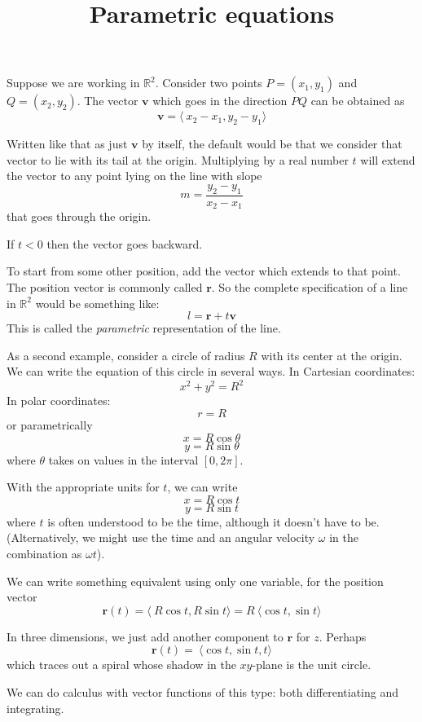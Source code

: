 \documentclass[11pt, oneside]{article}
\title{Parametric equations}
\date{}
\begin{document}
\maketitle
\Large

\label{sec:Parametric_equations}

Suppose we are working in $\mathbb{R}^2$.  Consider two points $P = (x_1,y_1)$ and $Q = (x_2, y_2)$.  The vector $\mathbf{v}$ which goes in the direction $PQ$ can be obtained as
\[ \mathbf{v} = \langle \ x_2 - x_1, y_2 - y_1 \rangle \]

Written like that as just $\mathbf{v}$ by itself, the default would be that we consider that vector to lie with its tail at the origin.  Multiplying by a real number $t$ will extend the vector to any point lying on the line with slope
\[ m = \frac{y_2 - y_1}{x_2 - x_1} \]
that goes through the origin.  

If $t < 0$ then the vector goes backward.

To start from some other position, add the vector which extends to that point.  The position vector is commonly called $\mathbf{r}$.  So the complete specification of a line in $\mathbb{R}^2$ would be something like:
\[ l = \mathbf{r} + t \mathbf{v} \]
This is called the \emph{parametric} representation of the line.

As a second example, consider a circle of radius $R$ with its center at the origin.  We can write the equation of this circle in several ways.  In Cartesian coordinates:
\[ x^2 + y^2 = R^2 \]
In polar coordinates:
\[ r = R \]
or parametrically
\[ x = R \cos \theta \]
\[ y = R \sin \theta \]
where $\theta$ takes on values in the interval $[0, 2\pi]$.

With the appropriate units for $t$, we can write
\[ x = R \cos t \]
\[ y = R \sin t \]
where $t$ is often understood to be the time, although it doesn't have to be.  (Alternatively, we might use the time and an angular velocity $\omega$ in the combination as $\omega t$).

We can write something equivalent using only one variable, for the position vector
\[ \mathbf{r}(t) = \langle \ R \cos t, R \sin t \rangle = R \ \langle \cos t, \sin t \rangle  \]

In three dimensions, we just add another component to $\mathbf{r}$ for $z$.  Perhaps
\[ \mathbf{r}(t) =  \ \langle \cos t, \sin t, t  \rangle  \]
which traces out a spiral whose shadow in the $xy$-plane is the unit circle.

We can do calculus with vector functions of this type:  both differentiating and integrating.
\end{document}

